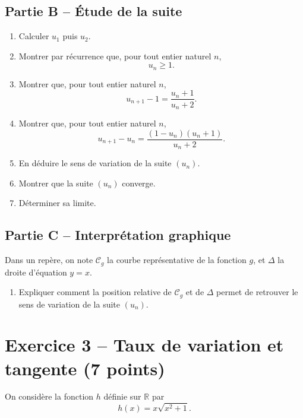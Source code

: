 \documentclass[11pt,a4paper]{article}
\newcommand{\R}{\mathbb{R}}
\begin{document}
\subsection*{Partie B -- Étude de la suite}
\begin{enumerate}[label=\textbf{\arabic*.}, start=7, leftmargin=1.1cm]
    \item Calculer \( u_1 \) puis \( u_2 \).
    \item Montrer par récurrence que, pour tout entier naturel \( n \),
    \[
    u_n\ge 1.
    \]
    \item Montrer que, pour tout entier naturel \( n \),
    \[
    u_{n+1}-1=\frac{u_n+1}{u_n+2}.
    \]
    \item Montrer que, pour tout entier naturel \( n \),
    \[
    u_{n+1}-u_n=\frac{(1-u_n)(u_n+1)}{u_n+2}.
    \]
    \item En déduire le sens de variation de la suite \( (u_n) \).
    \item Montrer que la suite \( (u_n) \) converge.
    \item Déterminer sa limite.
\end{enumerate}

\subsection*{Partie C -- Interprétation graphique}
Dans un repère, on note \( \mathcal C_g \) la courbe représentative de la fonction \( g \), et \( \Delta \) la droite d'équation \( y=x \).

\begin{enumerate}[label=\textbf{\arabic*.}, start=14, leftmargin=1.1cm]
    \item Expliquer comment la position relative de \( \mathcal C_g \) et de \( \Delta \) permet de retrouver le sens de variation de la suite \( (u_n) \).
\end{enumerate}

\vspace{0.5em}

\section*{Exercice 3 -- Taux de variation et tangente \hfill \textnormal{(7 points)}}

On considère la fonction \( h \) définie sur \( \R \) par
\[
h(x)=x\sqrt{x^2+1}.
\]
\end{document}
